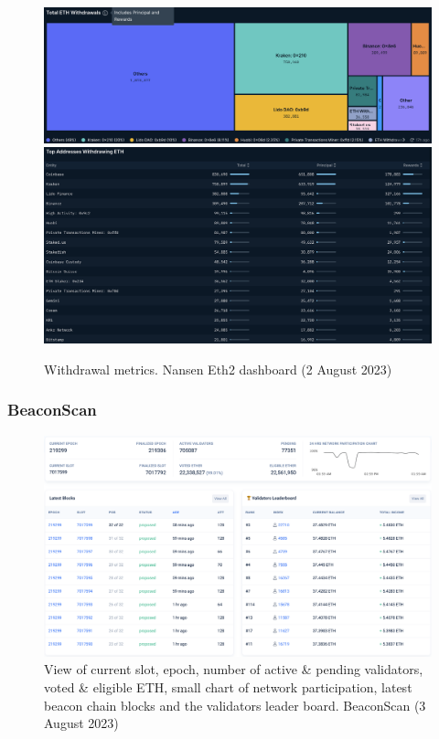 \documentclass[UTF8]{article}
\begin{document}
{\begin{figure}[htbp]
\begin{center}
\includegraphics[width=\linewidth]{images/nansen13}\\
\includegraphics[width=\linewidth]{images/nansen14}
\caption{Withdrawal metrics. Nansen Eth2 dashboard (2 August 2023)}
\label{fig:nansen13}
\end{center}
\end{figure}

\clearpage

\subsubsection*{BeaconScan}
\begin{figure}[htbp]
\begin{center}
\includegraphics[width=\linewidth]{images/beaconscan1}
\caption{View of current slot, epoch, number of active \& pending validators, voted \& eligible ETH, small chart of network participation, latest beacon chain blocks and the validators leader board. BeaconScan (3 August 2023)}
\label{fig:beaconscan1}
\end{center}
\end{figure}

}
\end{document}
